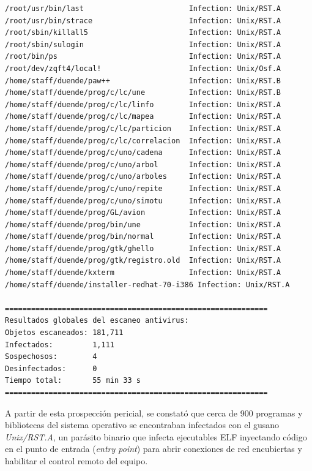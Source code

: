 \begin{lstlisting}[style=terminal,caption={Extracto de infecciones detectadas por el escáner antivirus en el sistema examinado.},label={lst:fprot_results}]
/root/usr/bin/last                        Infection: Unix/RST.A
/root/usr/bin/strace                      Infection: Unix/RST.A
/root/sbin/killall5                       Infection: Unix/RST.A
/root/sbin/sulogin                        Infection: Unix/RST.A
/root/bin/ps                              Infection: Unix/RST.A
/root/dev/zqft4/local!                    Infection: Unix/Osf.A
/home/staff/duende/paw++                  Infection: Unix/RST.B
/home/staff/duende/prog/c/lc/une          Infection: Unix/RST.B
/home/staff/duende/prog/c/lc/linfo        Infection: Unix/RST.A
/home/staff/duende/prog/c/lc/mapea        Infection: Unix/RST.A
/home/staff/duende/prog/c/lc/particion    Infection: Unix/RST.A
/home/staff/duende/prog/c/lc/correlacion  Infection: Unix/RST.A
/home/staff/duende/prog/c/uno/cadena      Infection: Unix/RST.A
/home/staff/duende/prog/c/uno/arbol       Infection: Unix/RST.A
/home/staff/duende/prog/c/uno/arboles     Infection: Unix/RST.A
/home/staff/duende/prog/c/uno/repite      Infection: Unix/RST.A
/home/staff/duende/prog/c/uno/simotu      Infection: Unix/RST.A
/home/staff/duende/prog/GL/avion          Infection: Unix/RST.A
/home/staff/duende/prog/bin/une           Infection: Unix/RST.A
/home/staff/duende/prog/bin/normal        Infection: Unix/RST.A
/home/staff/duende/prog/gtk/ghello        Infection: Unix/RST.A
/home/staff/duende/prog/gtk/registro.old  Infection: Unix/RST.A
/home/staff/duende/kxterm                 Infection: Unix/RST.A
/home/staff/duende/installer-redhat-70-i386 Infection: Unix/RST.A

============================================================
Resultados globales del escaneo antivirus:
Objetos escaneados: 181,711
Infectados:         1,111
Sospechosos:        4
Desinfectados:      0
Tiempo total:       55 min 33 s
============================================================
\end{lstlisting}

A partir de esta prospección pericial, se constató que cerca de 900 programas y bibliotecas del sistema operativo se encontraban infectados con el gusano \textit{Unix/RST.A}, un parásito binario que infecta ejecutables ELF inyectando código en el punto de entrada (\textit{entry point}) para abrir conexiones de red encubiertas y habilitar el control remoto del equipo. 

